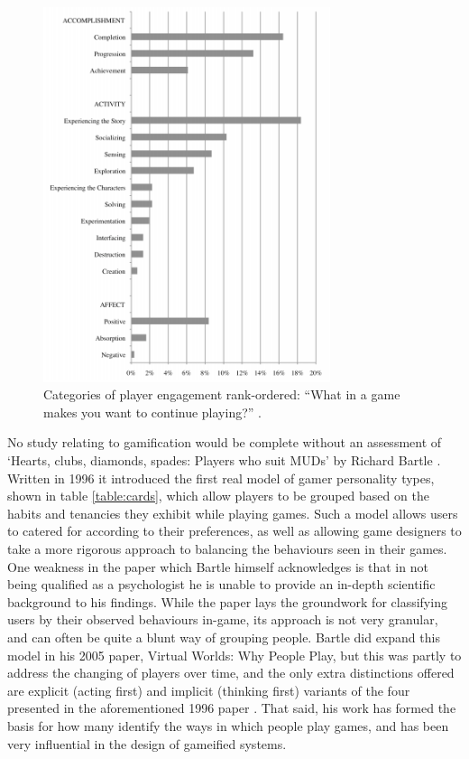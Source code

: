 \documentclass[12pt,a4paper,twoside]{report}
\begin{document}
\begin{figure}
\begin{center}
	\includegraphics[width=0.75\textwidth]{../img/fog.png}
	\caption{Categories of player engagement rank-ordered: ``What in a game makes you want to continue playing?'' \cite{schoenau2011player}.}
	\label{fog}
\end{center}
\end{figure}

No study relating to gamification would be complete without an assessment of `Hearts, clubs, diamonds, spades: Players who suit MUDs' by Richard Bartle \cite{bartle1996hearts}. Written in 1996 it introduced the first real model of gamer personality types, shown in table \ref{table:cards}, which allow players to be grouped based on the habits and tenancies they exhibit while playing games. Such a model allows users to catered for according to their preferences, as well as allowing game designers to take a more rigorous approach to balancing the behaviours seen in their games.  One weakness in the paper which Bartle himself acknowledges is that in not being qualified as a psychologist he is unable to provide an in-depth scientific background to his findings. While the paper lays the groundwork for classifying users by their observed behaviours in-game, its approach is not very granular, and can often be quite a blunt way of grouping people. Bartle did expand this model in his 2005 paper, Virtual Worlds: Why People Play, but this was partly to address the changing of players over time, and the only extra distinctions offered are explicit (acting first) and implicit (thinking first) variants of the four presented in the aforementioned 1996 paper \cite{bartle2005play}. That said, his work has formed the basis for how many identify the ways in which people play games, and has been very influential in the design of gameified systems.
\end{document}
